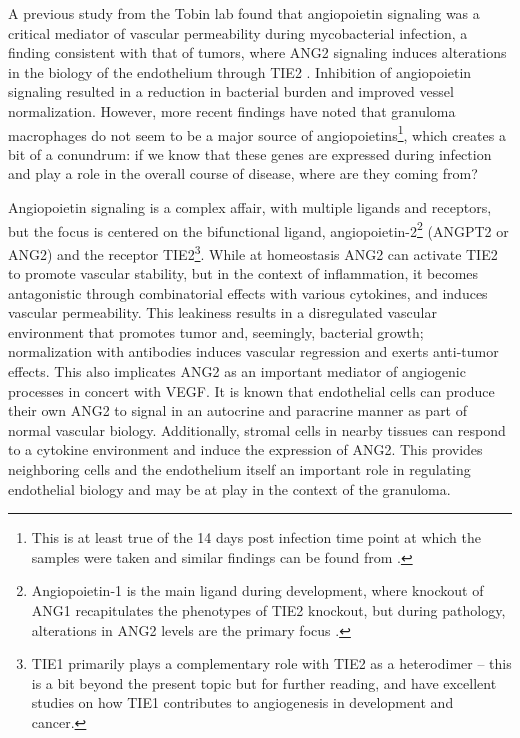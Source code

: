 A previous study from the Tobin lab found that angiopoietin signaling was a critical mediator of vascular permeability during mycobacterial infection, a finding consistent with that of tumors, where ANG2 signaling induces alterations in the biology of the endothelium through TIE2 \citep{Oehlers2017, Duran2021, Goel2012}. Inhibition of angiopoietin signaling resulted in a reduction in bacterial burden and improved vessel normalization. However, more recent findings have noted that granuloma macrophages do not seem to be a major source of angiopoietins\footnote{This is at least true of the 14 days post infection time point at which the samples were taken and similar findings can be found from \citet{Gideon2022}.}, which creates a bit of a conundrum: if we know that these genes are expressed during infection and play a role in the overall course of disease, where are they coming from? \citep{Cronan2021} 

Angiopoietin signaling is a complex affair, with multiple ligands and receptors, but the focus is centered on the bifunctional ligand, angiopoietin-2\footnote{Angiopoietin-1 is the main ligand during development, where knockout of ANG1 recapitulates the phenotypes of TIE2 knockout, but during pathology, alterations in ANG2 levels are the primary focus \citep{Akwii2021}.} (ANGPT2 or ANG2) and the receptor TIE2\footnote{TIE1 primarily plays a complementary role with TIE2 as a heterodimer -- this is a bit beyond the present topic but for further reading, \citet{Savant2015} and \citet{LaPorta2018} have excellent studies on how TIE1 contributes to angiogenesis in development and cancer.}. While at homeostasis ANG2 can activate TIE2 to promote vascular stability, but in the context of inflammation, it becomes antagonistic through combinatorial effects with various cytokines, and induces vascular permeability. This leakiness results in a disregulated vascular environment that promotes tumor and, seemingly, bacterial growth; normalization with antibodies induces vascular regression and exerts anti-tumor effects. This also implicates ANG2 as an important mediator of angiogenic processes in concert with VEGF. It is known that endothelial cells can produce their own ANG2 to signal in an autocrine and paracrine manner as part of normal vascular biology. Additionally, stromal cells in nearby tissues can respond to a cytokine environment and induce the expression of ANG2. This provides neighboring cells and the endothelium itself an important role in regulating endothelial biology and may be at play in the context of the granuloma.

